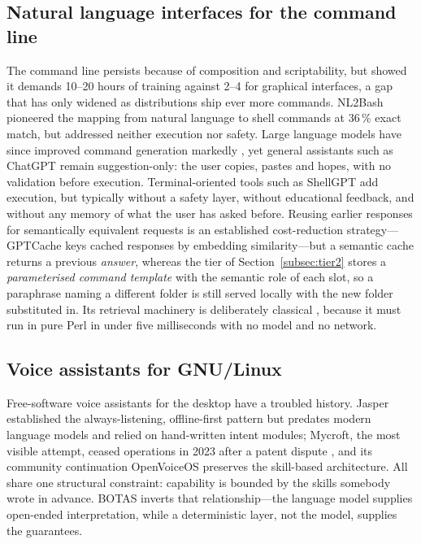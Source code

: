 \documentclass[10pt,a4paper]{article}
\begin{document}
\subsection{Natural language interfaces for the command line}
\label{subsec:rw-cli}

The command line persists because of composition and scriptability, but \citet{Nielsen1994} showed it demands 10--20 hours of training against 2--4 for graphical interfaces, a gap that has only widened as distributions ship ever more commands. NL2Bash \citep{Lin2018} pioneered the mapping from natural language to shell commands at 36\,\% exact match, but addressed neither execution nor safety. Large language models have since improved command generation markedly \citep{Brown2020}, yet general assistants such as ChatGPT \citep{OpenAI2023} remain suggestion-only: the user copies, pastes and hopes, with no validation before execution. Terminal-oriented tools such as ShellGPT \citep{ShellGPT2024} add execution, but typically without a safety layer, without educational feedback, and without any memory of what the user has asked before. Reusing earlier responses for semantically equivalent requests is an established cost-reduction strategy---GPTCache \citep{Bang2023} keys cached responses by embedding similarity---but a semantic cache returns a previous \emph{answer}, whereas the tier of Section~\ref{subsec:tier2} stores a \emph{parameterised command template} with the semantic role of each slot, so a paraphrase naming a different folder is still served locally with the new folder substituted in. Its retrieval machinery is deliberately classical \citep{Manning2008}, because it must run in pure Perl in under five milliseconds with no model and no network.

\subsection{Voice assistants for GNU/Linux}
\label{subsec:rw-voice}

Free-software voice assistants for the desktop have a troubled history. Jasper \citep{Saha2014} established the always-listening, offline-first pattern but predates modern language models and relied on hand-written intent modules; Mycroft, the most visible attempt, ceased operations in 2023 after a patent dispute \citep{Dobberstein2023}, and its community continuation OpenVoiceOS \citep{OVOS2024} preserves the skill-based architecture. All share one structural constraint: capability is bounded by the skills somebody wrote in advance. BOTAS inverts that relationship---the language model supplies open-ended interpretation, while a deterministic layer, not the model, supplies the guarantees.
\end{document}
